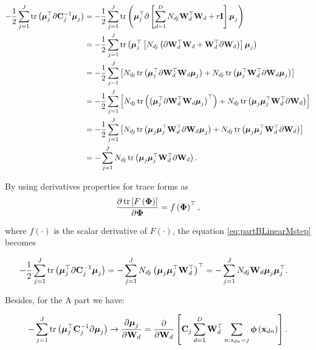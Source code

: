 	
	
	\begin{align}
	-\frac{1}{2}\sum_{j=1}^{J} \operatorname{tr}\left( \boldsymbol{\mu}_j^\top\partial\mathbf{C}_j^{-1}\boldsymbol{\mu}_j\right) &= -\frac{1}{2}\sum_{j=1}^{J} \operatorname{tr}\left( \boldsymbol{\mu}_j^\top\partial\left[\sum_{d=1}^{D}N_{dj}\mathbf{W}_d^\top\mathbf{W}_d+r\mathbf{I}\right]\boldsymbol{\mu}_j\right) \notag \\
	&=  -\frac{1}{2}\sum_{j=1}^{J} \operatorname{tr}\left( \boldsymbol{\mu}_j^\top\left[N_{dj}\left(\partial\mathbf{W}_d^\top\mathbf{W}_d+\mathbf{W}_d^\top\partial\mathbf{W}_d\right)\right]\boldsymbol{\mu}_j\right) \notag \\
	&=  -\frac{1}{2}\sum_{j=1}^{J} \left[N_{dj}\operatorname{tr}\left( \boldsymbol{\mu}_j^\top\partial\mathbf{W}_d^\top\mathbf{W}_d\boldsymbol{\mu}_j\right)+N_{dj}\operatorname{tr}\left(\boldsymbol{\mu}_j^\top\mathbf{W}_d^\top\partial\mathbf{W}_d\boldsymbol{\mu}_j\right)\right] \notag \\
	&=  -\frac{1}{2}\sum_{j=1}^{J} \left[N_{dj}\operatorname{tr}\left( \left(\boldsymbol{\mu}_j^\top\partial\mathbf{W}_d^\top\mathbf{W}_d\boldsymbol{\mu}_j\right)^\top\right)+N_{dj}\operatorname{tr}\left(\boldsymbol{\mu}_j\boldsymbol{\mu}_j^\top\mathbf{W}_d^\top\partial\mathbf{W}_d\right)\right] \notag\\
	&=  -\frac{1}{2}\sum_{j=1}^{J} \left[N_{dj}\operatorname{tr}\left( \boldsymbol{\mu}_j\boldsymbol{\mu}_j^\top\mathbf{W}_d^\top\partial\mathbf{W}_d\boldsymbol{\mu}_j\right)+N_{dj}\operatorname{tr}\left(\boldsymbol{\mu}_j\boldsymbol{\mu}_j^\top\mathbf{W}_d^\top\partial\mathbf{W}_d\right)\right] \notag\\
	&=  -\sum_{j=1}^{J} N_{dj}\operatorname{tr}\left( \boldsymbol{\mu}_j\boldsymbol{\mu}_j^\top\mathbf{W}_d^\top\partial\mathbf{W}_d\right).
	\label{eq:partBLinearMstepf}
	\end{align}
	
	
	By using derivatives properties for trace forms as 
	\begin{align}
	\frac{\partial \operatorname{tr}\left[F\left(\boldsymbol{\Phi}\right)\right]}{\partial \boldsymbol{\Phi}} = f\left(\boldsymbol{\Phi}\right)^\top,
	\end{align}
	
	where $f\left(\cdot\right)$ is the scalar derivative of $F\left(\cdot\right)$, the equation \eqref{eq:partBLinearMstep} becomes
	
	\begin{align}
	-\frac{1}{2}\sum_{j=1}^{J} \operatorname{tr}\left( \boldsymbol{\mu}_j^\top\partial\mathbf{C}_j^{-1}\boldsymbol{\mu}_j\right) &= -\sum_{j=1}^{J} N_{dj}\left( \boldsymbol{\mu}_j\boldsymbol{\mu}_j^\top\mathbf{W}_d^\top\right)^\top =  -\sum_{j=1}^{J} N_{dj} \mathbf{W}_d \boldsymbol{\mu}_j\boldsymbol{\mu}_j^\top.
	\end{align}
	
	Besides, for the A part we have:
	
	\begin{align}
	-\sum_{j=1}^{J}\operatorname{tr}\left( \boldsymbol{\mu}_j^\top\mathbf{C}_j^{-1}\partial\boldsymbol{\mu}_j\right) \rightarrow \frac{\partial \boldsymbol{\mu}_j}{\partial \mathbf{W}_d} = \frac{\partial}{\partial \mathbf{W}_d}\left[\mathbf{C}_j\sum_{d=1}^{D}\mathbf{W}_d^\top\sum_{n:s_{dn}=j}\boldsymbol{\phi}\left(\mathbf{x}_{dn}\right)\right].
	\end{align}
	
